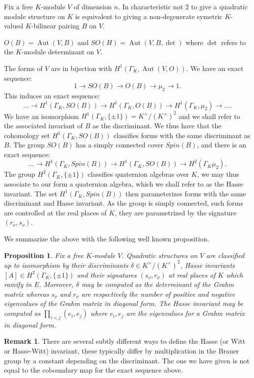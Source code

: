 \documentclass{article}
\theoremstyle{plain}
\newtheorem{proposition}[theorem]{Proposition}
\theoremstyle{definition}
\newtheorem{remark}[theorem]{Remark}
\DeclareMathOperator{\Aut}{Aut}
\newcommand{\GalKbK}{\Gamma_K}
\begin{document}
Fix a free $K$-module $V$ of dimension $n$. In characteristic not $2$ to give a quadratic module structure on $K$ is equivalent to giving a non-degenerate symetric $K$-valued $K$-bilinear pairing $B$ on $V$.

$O(B) = \Aut(V,B)$ and $SO(H) = \Aut(V,B,\det)$ where $\det$ refers to the $K$-module determinant on $V$.

The forms of $V$ are in bijection with $H^1(\GalKbK, \Aut(V,O))$.
We have an exact sequence:
\[ 1 \rightarrow SO(B) \rightarrow O(B) \rightarrow \mu_2  \rightarrow 1. \]
This induces an exact sequence:
\[ \ldots \rightarrow H^1(\GalKbK,SO(B))  \rightarrow H^1(\GalKbK,O(B))  \rightarrow H^1(\GalKbK,\mu_2 ) \rightarrow \ldots. \]
We have an isomorphism $H^1(\GalKbK, \{\pm1\}) = K^\times/(K^\times)^2$ and we shall refer to the associated invariant of $B$ as the discriminant.
We thus have that the cohomology set $H^1(\GalKbK,SO(B))$ classifies forms with the same discriminant as $B$.
The group $SO(B)$ has a simply connected cover $Spin(B)$, and there is an exact sequence:
\[ \ldots \rightarrow H^1(\GalKbK,Spin(B))  \rightarrow H^1(\GalKbK,SO(B))  \rightarrow H^2(\GalKbK \mu_2 ).\]
The group $H^2(\GalKbK,\{ \pm 1 \} )$ classifies quaternion algebras over $K$, we may thus associate to our form a quaternion algebra, which we shall refer to as the Hasse invariant.
The set $H^1(\GalKbK,Spin(B)) $ then parameterizes forms with the same discriminant and Hasse invariant. As the group is simply connected, such forms are controlled at the real places of $K$, they are parametrized by the signature $(r_\nu,s_\nu)$.

We summarize the above with the following well known proposition.
\begin{proposition}
Fix a free $K$-module $V$.
Quadratic structures on $V$ are classified up to isomorphism by their discriminants $\delta \in K^\times/(K^\times)^2$, Hasse invariants $[A] \in  H^2(\GalKbK,\{ \pm 1 \} )$ and their signatures $(s_\nu,r_\nu)$ at real places of $K$ which ramify in $E$.
Moreover, $\delta$ may be computed as the determinant of the Grahm matrix whereas $s_\nu$ and $r_\nu$ are respectively the number of positive and negative eigenvalues of the Grahm matrix in diagonal form.
The Hasse invariant may be computed as $\prod_{i<j}(e_i,e_j)$ where $e_i,e_j$ are the eigenvalues for a Grahm matrix in diagonal form.
\end{proposition}

\begin{remark}
There are several subtly different ways to define the Hasse (or Witt or Hasse-Witt) invariant, these typically differ by multiplication in the Brauer group by a constant depending on the discriminant.
The one we have given is not equal to the coboundary map for the exact sequence above.
\end{remark}
\end{document}
